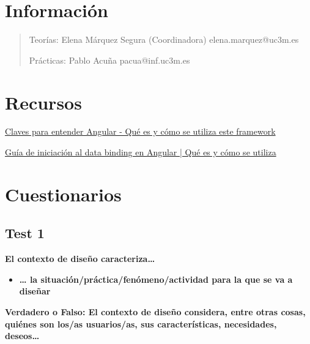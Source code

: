 \documentclass[12pt]{report} %
\begin{document}
\listoffigures
\thispagestyle{fancy}

\listoftables
\thispagestyle{fancy}

\clearpage
{} %




\section{Información}
\begin{quote}
Teorías: Elena Márquez Segura (Coordinadora) elena.marquez@uc3m.es

Prácticas: Pablo Acuña pacua@inf.uc3m.es
\end{quote}

\section{Recursos}

\href{https://www.acontracorrientech.com/claves-para-entender-angular-que-es-y-como-se-utiliza/}{Claves
para entender Angular - Qué es y cómo se utiliza este framework}

\href{https://www.acontracorrientech.com/guia-practica-del-databinding-en-angular/}{Guía
de iniciación al data binding en Angular | Qué es y cómo se
utiliza}

\section{Cuestionarios}

\subsection{Test 1}

\textbf{El contexto de diseño caracteriza\ldots{}}

\begin{itemize}

  \item
  \textbf{\ldots{} la situación/práctica/fenómeno/actividad para la que
  se va a diseñar}
\end{itemize}

\textbf{Verdadero o Falso: El contexto de diseño considera, entre otras
cosas, quiénes son los/as usuarios/as, sus características, necesidades,
deseos\ldots{}}
\end{document}
